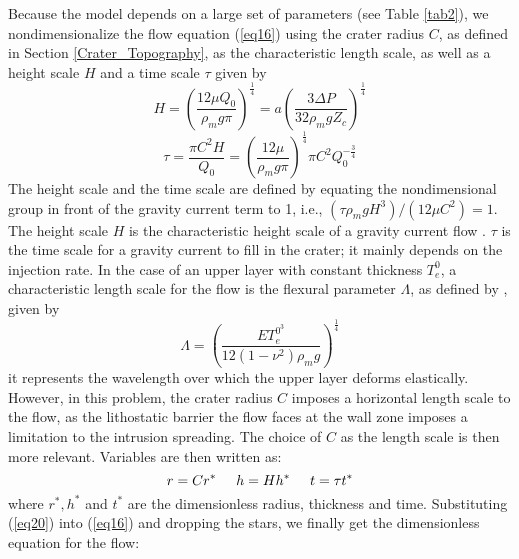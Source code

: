 \begin{article}
Because the  model depends  on a  large set  of parameters  (see Table
\ref{tab2}), we nondimensionalize the flow equation (\ref{eq16}) using
the crater radius $C$,  as defined in Section \ref{Crater_Topography},
as the characteristic length scale, as  well as a height scale $H$ and
a time scale $\tau$ given by
\begin{equation}
  \label{eq18}
  H= \left (\frac{12\mu Q_{0}}{\rho_{m}g \pi}\right ) ^{\frac{1}{4}}=a\left( \frac{3 \Delta P}{32\rho_{m}gZ_{c}}\right ) ^{\frac{1}{4}}
\end{equation}
\begin{equation}
  \tau=\frac{\pi C^{2} H}{Q_{0}}=\left (\frac{12\mu}{\rho_{m}g \pi}\right)^{\frac{1}{4}}\pi C^{2}Q_{0}^{-\frac{
      3}{4}}\label{eq19}
\end{equation}
The  height scale  and  the time  scale are  defined  by equating  the
nondimensional group in front of the  gravity current term to 1, i.e.,
$(\tau \rho_{m}gH^{3})/(12\mu  C^{2})=1$. The height scale  $H$ is the
characteristic   height    scale   of    a   gravity    current   flow
\citep{Huppert1982}. $\tau$ is the time scale for a gravity current to
fill in  the crater; it mainly  depends on the injection  rate. In the
case  of   an  upper   layer  with   constant  thickness   $T_e^0$,  a
characteristic length  scale for  the flow  is the  flexural parameter
$\Lambda$, as defined by \citet{Turcotte1981}, given by
\begin{equation}
  \Lambda=\left( \frac{E T_{e}^{0^{3}}}{12 (1-\nu^{2})\rho_{m}g} \right )^{\frac{1}{4}}
  \label{eq99}
\end{equation}
it  represents  the wavelength  over  which  the upper  layer  deforms
elastically. However, in this problem, the crater radius $C$ imposes a
horizontal length  scale to the  flow, as the lithostatic  barrier the
flow faces  at the  wall zone  imposes a  limitation to  the intrusion
spreading.  The  choice of  $C$  as  the  length  scale is  then  more
relevant. Variables are then written as:
\begin{equation}
  r=Cr^{*} \hspace{0.5cm}h=Hh^{*} \hspace{0.5cm} t=\tau t^{*} 
  \label{eq20}
\end{equation}
where  $r^{*},h^{*}$   and  $t^{*}$  are  the   dimensionless  radius,
thickness and  time. Substituting  (\ref{eq20}) into  (\ref{eq16}) and
dropping the stars, we finally  get the dimensionless equation for the
flow:


\end{article}
